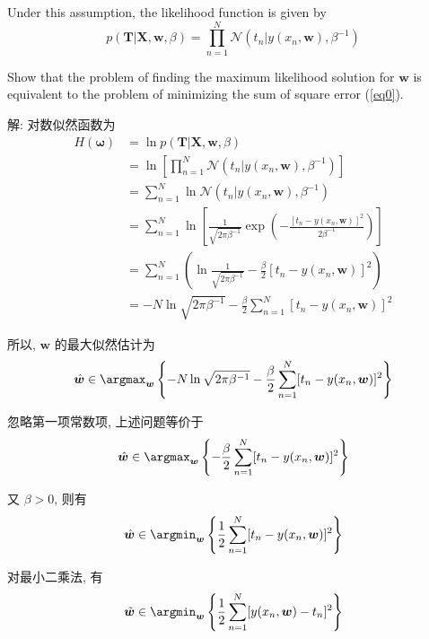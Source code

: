 \documentclass[openany]{ctexbook}
\theoremstyle{kaiti}
\theoremstyle{normal}
\begin{document}
Under this assumption, the likelihood function is given by 
\begin{equation}
  p(\bm{T}|\bm{X},\bm{w},\beta)=\prod_{n=1}^N \mathcal{N}(t_n|y(x_n,\bm{w}),\beta^{-1})
\end{equation}

Show that the problem of finding the maximum likelihood solution for $\bm{w}$ is equivalent to the problem of minimizing the sum of square error (\ref{eq0}).

解: 对数似然函数为
\begin{equation}
  \begin{aligned}
    H(\bm{\omega})
    &=\ln p(\bm{T}|\bm{X},\bm{w},\beta)\\
    &=\ln\left[\prod_{n=1}^N \mathcal{N}(t_n|y(x_n,\bm{w}),\beta^{-1})\right]\\
    &=\sum_{n=1}^N\ln\mathcal{N}(t_n|y(x_n,\bm{w}),\beta^{-1})\\
    &=\sum_{n=1}^N\ln\left[\frac{1}{\sqrt{2\pi\beta^{-1}}}\exp\left(-\frac{[t_n-y(x_n,\bm{w})]^2}{2\beta^{-1}}\right)\right]\\
    &=\sum_{n=1}^N\left(\ln\frac{1}{\sqrt{2\pi\beta^{-1}}}-\frac{\beta}{2}[t_n-y(x_n,\bm{w})]^2\right)\\
    &=-N\ln\sqrt{2\pi\beta^{-1}}-\frac{\beta}{2}\sum_{n=1}^N[t_n-y(x_n,\bm{w})]^2
  \end{aligned}
\end{equation}

所以, $\bm{w}$ 的最大似然估计为
\begin{equation}
  \hat{\bm{w}}\in\argmax_{\bm{w}}\left\{-N\ln\sqrt{2\pi\beta^{-1}}-\frac{\beta}{2}\sum_{n=1}^N[t_n-y(x_n,\bm{w})]^2\right\}
\end{equation}

忽略第一项常数项, 上述问题等价于
\begin{equation}
  \hat{\bm{w}}\in\argmax_{\bm{w}}\left\{-\frac{\beta}{2}\sum_{n=1}^N[t_n-y(x_n,\bm{w})]^2\right\}
\end{equation}

又 $\beta>0$, 则有
\begin{equation}
  \label{eq:mle}
  \hat{\bm{w}}\in\argmin_{\bm{w}}\left\{\frac{1}{2}\sum_{n=1}^N[t_n-y(x_n,\bm{w})]^2\right\}
\end{equation}

对最小二乘法, 有
\begin{equation}
  \label{eq:mse}
  \tilde{\bm{w}}\in\argmin_{\bm{w}}\left\{\frac{1}{2}\sum_{n=1}^N[y(x_n,\bm{w})-t_n]^2\right\}
\end{equation}
\end{document}
